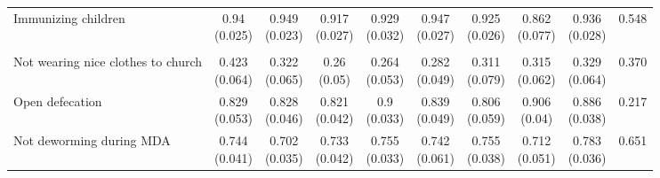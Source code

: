 \documentclass[
]{article}
\begin{document}
\begin{table}
{\begin{tabular}[t]{lccccccccc}
\hspace{1em}Immunizing children & \makecell[c]{0.94\\(0.025)} & \makecell[c]{0.949\\(0.023)} & \makecell[c]{0.917\\(0.027)} & \makecell[c]{0.929\\(0.032)} & \makecell[c]{0.947\\(0.027)} & \makecell[c]{0.925\\(0.026)} & \makecell[c]{0.862\\(0.077)} & \makecell[c]{0.936\\(0.028)} & 0.548\\
\addlinespace[0.3em]
\hline
\multicolumn{10}{l}{\textit{\textbf{Panel A: Stigma}}}\\
\hline
\hspace{1em}Not wearing nice clothes to church & \makecell[c]{0.423\\(0.064)} & \makecell[c]{0.322\\(0.065)} & \makecell[c]{0.26\\(0.05)} & \makecell[c]{0.264\\(0.053)} & \makecell[c]{0.282\\(0.049)} & \makecell[c]{0.311\\(0.079)} & \makecell[c]{0.315\\(0.062)} & \makecell[c]{0.329\\(0.064)} & 0.370\\
\hspace{1em}Open defecation & \makecell[c]{0.829\\(0.053)} & \makecell[c]{0.828\\(0.046)} & \makecell[c]{0.821\\(0.042)} & \makecell[c]{0.9\\(0.033)} & \makecell[c]{0.839\\(0.049)} & \makecell[c]{0.806\\(0.059)} & \makecell[c]{0.906\\(0.04)} & \makecell[c]{0.886\\(0.038)} & 0.217\\
\hspace{1em}Not deworming during MDA & \makecell[c]{0.744\\(0.041)} & \makecell[c]{0.702\\(0.035)} & \makecell[c]{0.733\\(0.042)} & \makecell[c]{0.755\\(0.033)} & \makecell[c]{0.742\\(0.061)} & \makecell[c]{0.755\\(0.038)} & \makecell[c]{0.712\\(0.051)} & \makecell[c]{0.783\\(0.036)} & 0.651\\

\end{tabular}}
\end{table}
\end{document}
